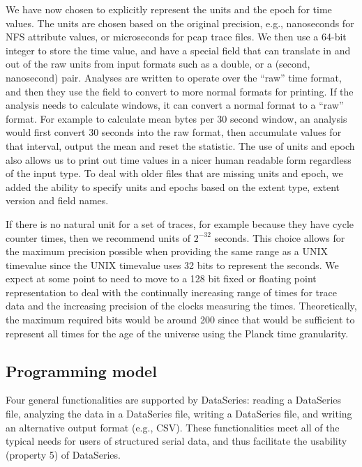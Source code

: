 \documentclass{acm_proc_article-sp}
\begin{document}
We have now chosen to explicitly represent the units and the epoch for
time values.  The units are chosen based on the original precision,
e.g., nanoseconds for NFS attribute values, or microseconds for pcap
trace files.  We then use a 64-bit integer to store the time value,
and have a special field that can translate in and out of the raw
units from input formats such as a double, or a (second, nanosecond)
pair.  Analyses are written to operate over the ``raw'' time format,
and then they use the field to convert to more normal formats for
printing.  If the analysis needs to calculate windows, it can convert
a normal format to a ``raw'' format.  For example to calculate mean
bytes per 30 second window, an analysis would first convert 30 seconds
into the raw format, then accumulate values for that
interval, output the mean and reset the statistic.  The use of units
and epoch also allows us to print out time values in a nicer human
readable form regardless of the input type.  To deal with older files
that are missing units and epoch, we added the ability to specify
units and epochs based on the extent type, extent version and field
names.

If there is no natural unit for a set of traces, for example because
they have cycle counter times, then we recommend units of $2^{-32}$
seconds.  This choice allows for the maximum precision possible when
providing the same range as a UNIX timevalue since the UNIX timevalue
uses 32 bits to represent the seconds.  We expect at some point to
need to move to a 128 bit fixed or floating point representation to
deal with the continually increasing range of times for trace data and
the increasing precision of the clocks measuring the times.  Theoretically,
the maximum required bits would be around 200 since that would be
sufficient to represent all times for the age of the universe
using the Planck time granularity.


\subsection{Programming model}

Four general functionalities are supported by DataSeries:
reading a DataSeries file, 
analyzing the data in a DataSeries file,
writing a DataSeries file,
and writing an alternative output format (e.g., CSV).
These functionalities meet all of the typical needs for
users of structured serial data, and thus facilitate
the usability (property 5) of DataSeries.
\end{document}

